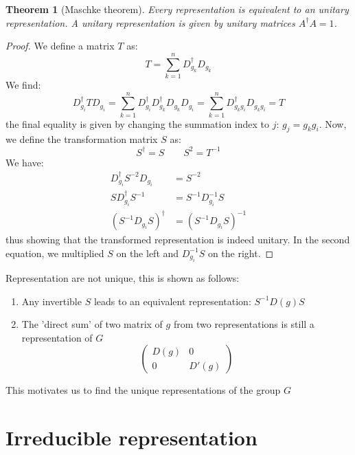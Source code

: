 \documentclass{amsart}
\newtheorem*{theorem}{Theorem}
\theoremstyle{remark}
\theoremstyle{remark}
\theoremstyle{definition}
\begin{document}
\begin{theorem}
    [Maschke theorem]
    Every representation is equivalent to an unitary representation. A unitary representation 
    is given by unitary matrices $A^{\dagger}A = 1$. 
\end{theorem}
\begin{proof}
We define a matrix $T$ as:
\begin{equation*}
    T = \sum_{k=1}^{n} D^{\dagger}_{g_k} D_{g_k}
\end{equation*}
We find:
\begin{equation*}
    D^{\dagger}_{g_i} T D_{g_i} = \sum_{k=1}^{n} D^{\dagger}_{g_i} D^{\dagger}_{g_k} D_{g_k} D_{g_i}
    = \sum_{k=1}^{n} D^{\dagger}_{g_kg_i} D_{g_kg_i} = T
\end{equation*}
the final equality is given by changing the summation index to $j$: $g_j = g_k g_i$.
Now, we define the transformation matrix $S$ as:
\begin{equation*}
    S^{\dagger} = S\qquad S^2 = T^{-1}
\end{equation*}
We have:
\begin{align*}
    D^{\dagger}_{g_i}S^{-2}D_{g_i} &= S^{-2} \\
    S D^{\dagger}_{g_i}S^{-1} &= S^{-1} D_{g_i}^{-1} S \\
    (S^{-1}D_{g_i}S)^{\dagger} &= (S^{-1}D_{g_i}S)^{-1}
\end{align*}
thus showing that the transformed representation is indeed unitary. In the second equation, 
we multiplied $S$ on the left and $D_{g_i}^{-1} S$ on the right.

\end{proof}

Representation are not unique, this is shown as follows:
\begin{enumerate}
    \item Any invertible $S$ leads to an equivalent representation: $S^{-1}D(g)S$
    \item The 'direct sum' of two matrix of $g$ from two representations is still a representation of $G$
            \[\left( \begin{matrix}
                D(g) & 0 \\
                0 & D'(g)
            \end{matrix} \right)\]
\end{enumerate}
This motivates us to find the unique representations of the group $G$

\vspace{10pt}
\section*{Irreducible representation}
\end{document}
